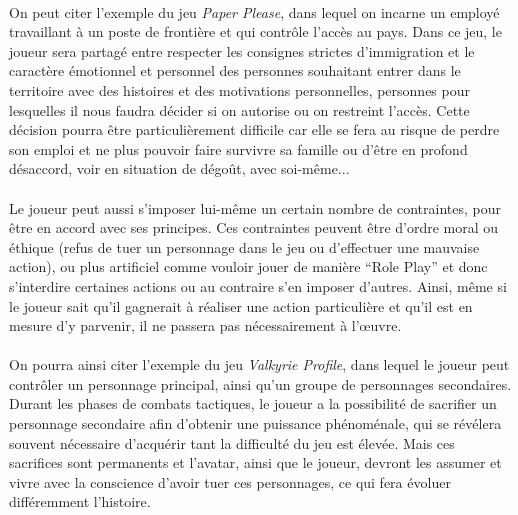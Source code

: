  \paragraph{}
On peut citer l’exemple du jeu \emph{Paper Please}, dans lequel on incarne un employé travaillant à un poste de frontière et qui contrôle l’accès au pays. Dans ce jeu, le joueur sera partagé entre respecter les consignes strictes d’immigration et le caractère émotionnel et personnel des personnes souhaitant entrer dans le territoire avec des histoires et des motivations personnelles, personnes pour lesquelles il nous faudra décider si on autorise ou on restreint l’accès. Cette décision pourra être particulièrement difficile car elle se fera au risque de perdre son emploi et ne plus pouvoir faire survivre sa famille ou d’être en profond désaccord, voir en situation de dégoût, avec soi-même...\paragraph{}
Le joueur peut aussi s’imposer lui-même un certain nombre de contraintes, pour être en accord avec ses principes. Ces contraintes peuvent être d’ordre moral ou éthique (refus de tuer un personnage dans le jeu ou d’effectuer une mauvaise action), ou plus artificiel comme vouloir jouer de manière “Role Play” et donc s’interdire certaines actions ou au contraire s’en imposer d’autres. Ainsi, même si le joueur sait qu’il gagnerait à réaliser une action particulière et qu’il est en mesure d’y parvenir, il ne passera pas nécessairement à l’œuvre. 
\paragraph{}On pourra ainsi citer l’exemple du jeu \emph{Valkyrie Profile}, dans lequel le joueur peut contrôler un personnage principal, ainsi qu’un groupe de personnages secondaires. Durant les phases de combats tactiques, le joueur a la possibilité de sacrifier un personnage secondaire afin d’obtenir une puissance phénoménale, qui se révélera souvent nécessaire d’acquérir tant la difficulté du jeu est élevée. Mais ces sacrifices sont permanents et l’avatar, ainsi que le joueur, devront les assumer et vivre avec la conscience d’avoir tuer ces personnages, ce qui fera évoluer différemment l’histoire.
